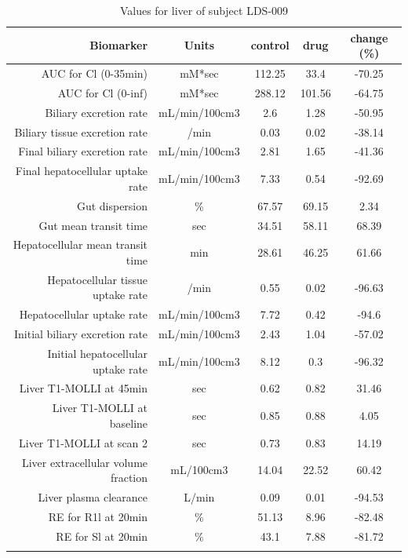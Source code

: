 \documentclass{epflreport}%
\begin{document}
%
\clearpage%
\begin{longtable}{rcccc}%
\hline%
Biomarker&Units&control&drug&change (\%)\\%
\hline%
AUC for Cl (0{-}35min)&mM*sec&112.25&33.4&{-}70.25\\%
AUC for Cl (0{-}inf)&mM*sec&288.12&101.56&{-}64.75\\%
Biliary excretion rate&mL/min/100cm3&2.6&1.28&{-}50.95\\%
Biliary tissue excretion rate&/min&0.03&0.02&{-}38.14\\%
Final biliary excretion rate&mL/min/100cm3&2.81&1.65&{-}41.36\\%
Final hepatocellular uptake rate&mL/min/100cm3&7.33&0.54&{-}92.69\\%
Gut dispersion&\%&67.57&69.15&2.34\\%
Gut mean transit time&sec&34.51&58.11&68.39\\%
Hepatocellular mean transit time&min&28.61&46.25&61.66\\%
Hepatocellular tissue uptake rate&/min&0.55&0.02&{-}96.63\\%
Hepatocellular uptake rate&mL/min/100cm3&7.72&0.42&{-}94.6\\%
Initial biliary excretion rate&mL/min/100cm3&2.43&1.04&{-}57.02\\%
Initial hepatocellular uptake rate&mL/min/100cm3&8.12&0.3&{-}96.32\\%
Liver T1{-}MOLLI at 45min&sec&0.62&0.82&31.46\\%
Liver T1{-}MOLLI at baseline&sec&0.85&0.88&4.05\\%
Liver T1{-}MOLLI at scan 2&sec&0.73&0.83&14.19\\%
Liver extracellular volume fraction&mL/100cm3&14.04&22.52&60.42\\%
Liver plasma clearance&L/min&0.09&0.01&{-}94.53\\%
RE for R1l at 20min&\%&51.13&8.96&{-}82.48\\%
RE for Sl at 20min&\%&43.1&7.88&{-}81.72\\%
\hline%
\caption{Values for liver of subject LDS-009} \\%
\end{longtable}%
\end{document}

